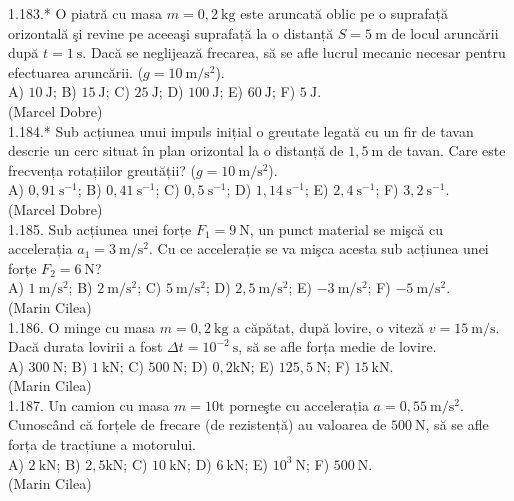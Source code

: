 1.183.* O piatră cu masa $m=0,2 \mathrm{~kg}$ este aruncată oblic pe o suprafață orizontală şi revine pe aceeaşi suprafață la o distanță $S=5 \mathrm{~m}$ de locul aruncării după $t=1 \mathrm{~s}$. Dacă se neglijează frecarea, să se afle lucrul mecanic necesar pentru efectuarea aruncării. ($g=10 \mathrm{~m} / \mathrm{s}^{2}$).\\ A) $10 \mathrm{~J}$; B) $15 \mathrm{~J}$; C) $25 \mathrm{~J}$; D) $100 \mathrm{~J}$; E) $60 \mathrm{~J}$; F) $5 \mathrm{~J}$.\\ (Marcel Dobre)\\

1.184.* Sub acțiunea unui impuls inițial o greutate legată cu un fir de tavan descrie un cerc situat în plan orizontal la o distanță de $1,5 \mathrm{~m}$ de tavan. Care este frecvența rotațiilor greutății? ($g=10 \mathrm{~m} / \mathrm{s}^{2}$).\\ A) $0,91 \mathrm{~s}^{-1}$; B) $0,41 \mathrm{~s}^{-1}$; C) $0,5 \mathrm{~s}^{-1}$; D) $1,14 \mathrm{~s}^{-1}$; E) $2,4 \mathrm{~s}^{-1}$; F) $3,2 \mathrm{~s}^{-1}$.\\ (Marcel Dobre)\\

1.185. Sub acțiunea unei forțe $F_{1}=9 \mathrm{~N}$, un punct material se mişcă cu accelerația $a_{1}=3 \mathrm{~m} / \mathrm{s}^{2}$. Cu ce accelerație se va mişca acesta sub acțiunea unei forțe $F_{2}=6 \mathrm{~N}$?\\ A) $1 \mathrm{~m} / \mathrm{s}^{2}$; B) $2 \mathrm{~m} / \mathrm{s}^{2}$; C) $5 \mathrm{~m} / \mathrm{s}^{2}$; D) $2,5 \mathrm{~m} / \mathrm{s}^{2}$; E) $-3 \mathrm{~m} / \mathrm{s}^{2}$; F) $-5 \mathrm{~m} / \mathrm{s}^{2}$.\\ (Marin Cilea)\\

1.186. O minge cu masa $m=0,2 \mathrm{~kg}$ a căpătat, după lovire, o viteză $v=15 \mathrm{~m} / \mathrm{s}$. Dacă durata lovirii a fost $\Delta t=10^{-2} \mathrm{~s}$, să se afle forța medie de lovire.\\ A) $300 \mathrm{~N}$; B) $1 \mathrm{~kN}$; C) $500 \mathrm{~N}$; D) $0,2 \mathrm{kN}$; E) $125,5 \mathrm{~N}$; F) $15 \mathrm{~kN}$.\\ (Marin Cilea)\\

1.187. Un camion cu masa $m=10 \mathrm{t}$ porneşte cu accelerația $a=0,55 \mathrm{~m} / \mathrm{s}^{2}$. Cunoscând că forțele de frecare (de rezistență) au valoarea de $500 \mathrm{~N}$, să se afle forța de tracțiune a motorului.\\ A) $2 \mathrm{~kN}$; B) $2,5 \mathrm{kN}$; C) $10 \mathrm{~kN}$; D) $6 \mathrm{~kN}$; E) $10^{3} \mathrm{~N}$; F) $500 \mathrm{~N}$.\\ (Marin Cilea)\\


